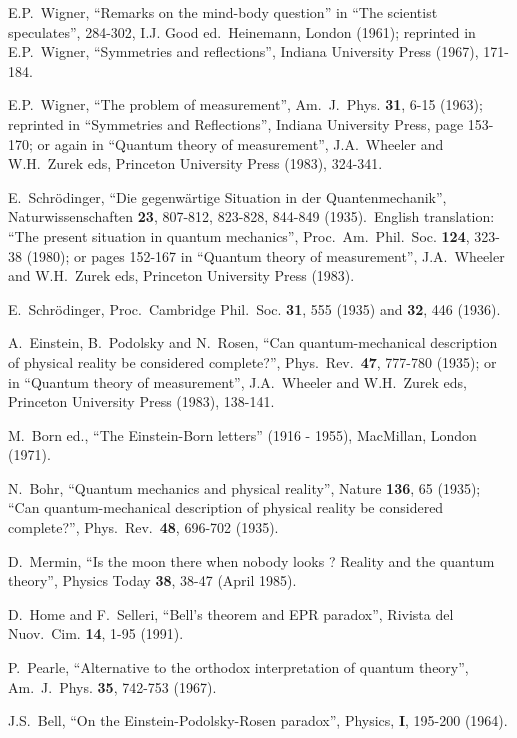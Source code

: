 \documentclass[12pt,onecolumn]{article}%
\begin{document}
\begin{thebibliography}{999}
E.P.\ Wigner, ``Remarks on the mind-body question'' in
``The scientist speculates'', 284-302, I.J. Good ed.\ Heinemann, London
(1961); reprinted in E.P.\ Wigner, ``Symmetries and reflections'', Indiana
University Press (1967), 171-184.

E.P.\ Wigner, ``The problem of measurement'', Am.\ J.\ Phys.
\textbf{31}, 6-15 (1963); reprinted in ``Symmetries and Reflections'', Indiana
University Press, page 153-170; or again in ``Quantum theory of measurement'',
J.A.\ Wheeler and W.H.\ Zurek eds, Princeton University Press (1983), 324-341.

E.\ Schr\"{o}dinger, ``Die gegenw\"{a}rtige Situation in der
Quantenmechanik'', Naturwissenschaften \textbf{23}, 807-812, 823-828, 844-849
(1935).\ English translation: ``The present situation in quantum mechanics'',
Proc.\ Am.\ Phil.\ Soc. \textbf{124}, 323-38 (1980); or pages 152-167 in
``Quantum theory of measurement'', J.A.\ Wheeler and W.H.\ Zurek eds,
Princeton University Press (1983).

E.\ Schr\"{o}dinger, Proc.\ Cambridge Phil.\ Soc. \textbf{31},
555 (1935) and \textbf{32}, 446 (1936).

A.\ Einstein, B.\ Podolsky and N.\ Rosen, ``Can
quantum-mechanical description of physical reality be considered complete?'',
Phys.\ Rev.\ \textbf{47}, 777-780 (1935); or in ``Quantum theory of
measurement'', J.A.\ Wheeler and W.H.\ Zurek eds, Princeton University Press
(1983), 138-141.

M.\ Born ed., ``The Einstein-Born letters'' (1916 -
1955), MacMillan, London (1971).

N.\ Bohr, ``Quantum mechanics and physical reality'',
Nature \textbf{136}, 65 (1935); ``Can quantum-mechanical description of
physical reality be considered complete?'', Phys.\ Rev.\ \textbf{48}, 696-702 (1935).

D.\ Mermin, ``Is the moon there when nobody looks ?
Reality and the quantum theory'', Physics Today \textbf{38}, 38-47 (April 1985).

D.\ Home and F.\ Selleri, ``Bell's theorem and EPR
paradox'', Rivista del Nuov.\ Cim. \textbf{14}, 1-95 (1991).

P.\ Pearle, ``Alternative to the orthodox interpretation of
quantum theory'', Am.\ J.\ Phys. \textbf{35}, 742-753 (1967).

J.S.\ Bell, ``On the Einstein-Podolsky-Rosen paradox'',
Physics, \textbf{I}, 195-200 (1964).


\end{thebibliography}
\end{document}
